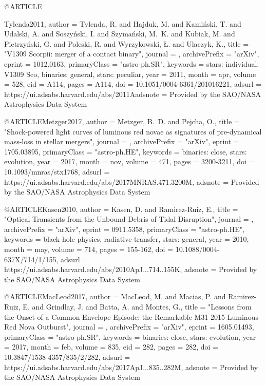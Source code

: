 \documentclass[twocolumn,tighten]{aastex63}
\begin{document}
@ARTICLE{Tylenda2011,
   author = {{Tylenda}, R. and {Hajduk}, M. and {Kami{\'n}ski}, T. and {Udalski}, A. and 
	{Soszy{\'n}ski}, I. and {Szyma{\'n}ski}, M.~K. and {Kubiak}, M. and 
	{Pietrzy{\'n}ski}, G. and {Poleski}, R. and {Wyrzykowski}, {\L}. and 
	{Ulaczyk}, K.},
    title = "{V1309 Scorpii: merger of a contact binary}",
  journal = {\aap},
archivePrefix = "arXiv",
   eprint = {1012.0163},
 primaryClass = "astro-ph.SR",
 keywords = {stars: individual: V1309 Sco, binaries: general, stars: peculiar},
     year = 2011,
    month = apr,
   volume = 528,
      eid = {A114},
    pages = {A114},
      doi = {10.1051/0004-6361/201016221},
   adsurl = {https://ui.adsabs.harvard.edu/abs/2011Aadsnote = {Provided by the SAO/NASA Astrophysics Data System}
}


@ARTICLE{Metzger2017,
   author = {{Metzger}, B.~D. and {Pejcha}, O.},
    title = "{Shock-powered light curves of luminous red novae as signatures of pre-dynamical mass-loss in stellar mergers}",
  journal = {\mnras},
archivePrefix = "arXiv",
   eprint = {1705.03895},
 primaryClass = "astro-ph.HE",
 keywords = {binaries: close, stars: evolution},
     year = 2017,
    month = nov,
   volume = 471,
    pages = {3200-3211},
      doi = {10.1093/mnras/stx1768},
   adsurl = {https://ui.adsabs.harvard.edu/abs/2017MNRAS.471.3200M},
  adsnote = {Provided by the SAO/NASA Astrophysics Data System}
}

@ARTICLE{Kasen2010,
   author = {{Kasen}, D. and {Ramirez-Ruiz}, E.},
    title = "{Optical Transients from the Unbound Debris of Tidal Disruption}",
  journal = {\apj},
archivePrefix = "arXiv",
   eprint = {0911.5358},
 primaryClass = "astro-ph.HE",
 keywords = {black hole physics, radiative transfer, stars: general},
     year = 2010,
    month = may,
   volume = 714,
    pages = {155-162},
      doi = {10.1088/0004-637X/714/1/155},
   adsurl = {https://ui.adsabs.harvard.edu/abs/2010ApJ...714..155K},
  adsnote = {Provided by the SAO/NASA Astrophysics Data System}
}

@ARTICLE{MacLeod2017,
   author = {{MacLeod}, M. and {Macias}, P. and {Ramirez-Ruiz}, E. and {Grindlay}, J. and 
	{Batta}, A. and {Montes}, G.},
    title = "{Lessons from the Onset of a Common Envelope Episode: the Remarkable M31 2015 Luminous Red Nova Outburst}",
  journal = {\apj},
archivePrefix = "arXiv",
   eprint = {1605.01493},
 primaryClass = "astro-ph.SR",
 keywords = {binaries: close, stars: evolution},
     year = 2017,
    month = feb,
   volume = 835,
      eid = {282},
    pages = {282},
      doi = {10.3847/1538-4357/835/2/282},
   adsurl = {https://ui.adsabs.harvard.edu/abs/2017ApJ...835..282M},
  adsnote = {Provided by the SAO/NASA Astrophysics Data System}
}

}
\end{document}
